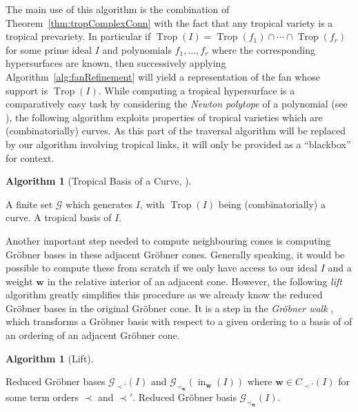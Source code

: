 \documentclass[
  paper=a4,
  titlepage,
  bibliography=totoc,
  listof=totoc,
  pagesize=pdftex
]{scrartcl}
\numberwithin{figure}{section}
\numberwithin{equation}{section}
\numberwithin{table}{section}
\let\vec\mathbf
\DeclareMathOperator{\Trop}{Trop}
\DeclareMathOperator{\initial}{in}
\theoremstyle{definition}
\newtheorem{algo}[definition]{Algorithm}
\numberwithin{definition}{section}
\begin{document}
The main use of this algorithm is the combination of Theorem~\ref{thm:tropComplexConn}
with the fact that any tropical variety is a tropical prevariety. In particular if
$\Trop(I) = \Trop(f_1) \cap \cdots \cap \Trop(f_r)$ for some prime ideal $I$ and
polynomials $f_1, \dots, f_r$ where the corresponding hypersurfaces are known, then
successively applying Algorithm~\ref{alg:fanRefinement} will yield a representation of the
fan whose support is $\Trop(I)$. While computing a tropical hypersurface is a
comparatively easy task by considering the \emph{Newton polytope} of a polynomial (see
\cite[Algorithm~4.3]{compTropVar}), the following algorithm exploits properties of
tropical varieties which are (combinatorially) curves. As this part of the traversal
algorithm will be replaced by our algorithm involving tropical links, it will only be
provided as a \enquote{blackbox} for context.

\begin{algo}[Tropical Basis of a Curve, {\cite[Algorihm~4.8]{compTropVar}}]\
  \label{alg:tropBasisCurve}
  \begin{algorithmic}[1]
    \Require A finite set $\mathcal G$ which generates $I$, with $\Trop(I)$ being
      (combinatorially) a curve.
    \Ensure A tropical basis of $I$.
  \end{algorithmic}
\end{algo}

Another important step needed to compute neighbouring cones is computing Gröbner bases in
these adjacent Gröbner cones. Generally speaking, it would be possible to compute these
from scratch if we only have access to our ideal $I$ and a weight $\vec w$ in the relative
interior of an adjacent cone. However, the following \emph{lift} algorithm greatly
simplifies this procedure as we already know the reduced Gröbner bases in the original
Gröbner cone. It is a step in the \emph{Gröbner walk} \cite{groebWalk}, which transforms a
Gröbner basis with respect to a given ordering to a basis of of an ordering of an adjacent
Gröbner cone.

\begin{algo}[Lift]\
  \label{alg:lift}
  \begin{algorithmic}[1]
    \Require Reduced Gröbner bases $\mathcal G_{\prec'}(I)$ and $\mathcal G_{\prec_{\vec
      w}}(\initial_{\vec w}(I))$ where $\vec w \in C_{\prec'}(I)$ for some term orders
      $\prec$ and $\prec'$.
    \Ensure Reduced Gröbner basis $\mathcal G_{\prec_{\vec w}}(I)$.
  \end{algorithmic}
\end{algo}
\end{document}
